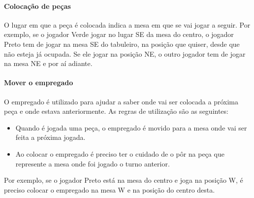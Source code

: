 \documentclass[a4paper]{article}
\begin{document}
\paragraph{Colocação de peças}
O lugar em que a peça é colocada indica a mesa em que se vai jogar a seguir. Por exemplo, se o jogador Verde jogar no lugar SE da mesa do centro, o jogador Preto tem de jogar na mesa SE do tabuleiro, na posição que quiser, desde que não esteja já ocupada. Se ele jogar na posição NE, o outro jogador tem de jogar na mesa NE e por aí adiante.

\paragraph{Mover o empregado}
O empregado é utilizado para ajudar a saber onde vai ser colocada a próxima peça e onde estava anteriormente. As regras de utilização são as seguintes:
\begin{itemize}
\item Quando é jogada uma peça, o empregado é movido para a mesa onde vai ser feita a próxima jogada.
\item Ao colocar o empregado é preciso ter o cuidado de o pôr na peça que represente a mesa onde foi jogado o turno anterior.
\end{itemize}
Por exemplo, se o jogador Preto está na mesa do centro e joga na posição W, é preciso colocar o empregado na mesa W e na posição do centro desta.
\end{document}
